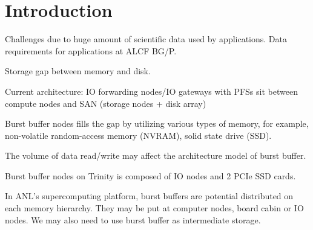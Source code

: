 \section{Introduction}

Challenges due to huge amount of scientific data used by applications.
Data requirements for applications at ALCF BG/P.

Storage gap between memory and disk.

Current architecture: IO forwarding nodes/IO gateways with PFSs sit between compute nodes and SAN (storage nodes + disk array)

Burst buffer nodes fills the gap by utilizing various types of memory, for example, non-volatile random-access memory (NVRAM), solid state drive (SSD).

The volume of data read/write may affect the architecture model of burst buffer.

Burst buffer nodes on Trinity is composed of IO nodes and 2 PCIe SSD cards.

In ANL's supercomputing platform, burst buffers are potential distributed on each memory hierarchy.
They may be put at computer nodes, board cabin or IO nodes.
We may also need to use burst buffer as intermediate storage.




